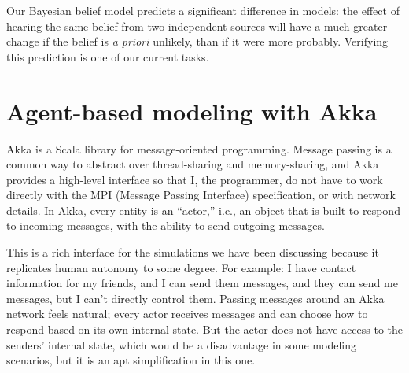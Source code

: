 \documentclass[11pt]{article}
\begin{document}
Our Bayesian belief model predicts a significant difference in models: the effect of hearing the same belief from two independent sources will have a much greater change if the belief is \emph{a priori} unlikely, than if it were more probably.
Verifying this prediction is one of our current tasks.






\section{Agent-based modeling with Akka}

Akka is a Scala library for message-oriented programming. Message passing is a common way to abstract over thread-sharing and memory-sharing, and Akka provides a high-level interface so that I, the programmer, do not have to work directly with the MPI (Message Passing Interface) specification, or with network details. In Akka, every entity is an ``actor,'' i.e., an object that is built to respond to incoming messages, with the ability to send outgoing messages.

This is a rich interface for the simulations we have been discussing because it replicates human autonomy to some degree. For example: I have contact information for my friends, and I can send them messages, and they can send me messages, but I can't directly control them. Passing messages around an Akka network feels natural; every actor receives messages and can choose how to respond based on its own internal state. But the actor does not have access to the senders' internal state, which would be a disadvantage in some modeling scenarios, but it is an apt simplification in this one.
\end{document}
